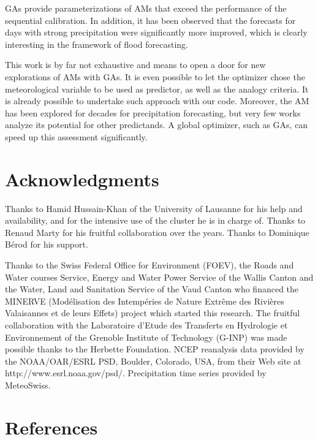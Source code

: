 \documentclass[5p]{elsarticle}
\begin{document}
GAs provide parameterizations of AMs that exceed the performance of the sequential calibration. In addition, it has been observed that the forecasts for days with strong precipitation were significantly more improved, which is clearly interesting in the framework of flood forecasting.

This work is by far not exhaustive and means to open a door for new explorations of AMs with GAs. It is even possible to let the optimizer chose the meteorological variable to be used as predictor, as well as the analogy criteria. It is already possible to undertake such approach with our code. Moreover, the AM has been explored for decades for precipitation forecasting, but very few works analyze its potential for other predictands. A global optimizer, such as GAs, can speed up this assessment significantly.


\section*{Acknowledgments}
Thanks to Hamid Hussain-Khan of the University of Lausanne for his help and availability, and for the intensive use of the cluster he is in charge of. Thanks to Renaud Marty for his fruitful collaboration over the years. Thanks to Dominique B\'{e}rod for his support.

Thanks to the Swiss Federal Office for Environment (FOEV), the Roads and Water courses Service, Energy and Water Power Service of the Wallis Canton and the Water, Land and Sanitation Service of the Vaud Canton who financed the MINERVE (Mod\'{e}lisation des Intemp\'{e}ries de Nature Extr\^{e}me des Rivi\`{e}res Valaisannes et de leurs Effets) project which started this research. The fruitful collaboration with the Laboratoire d'Etude des Transferts en Hydrologie et Environnement of the Grenoble Institute of Technology (G-INP) was made possible thanks to the Herbette Foundation. NCEP reanalysis data provided by the NOAA/OAR/ESRL PSD, Boulder, Colorado, USA, from their Web site at http://www.esrl.noaa.gov/psd/. Precipitation time series provided by MeteoSwiss. 


\section*{References}




\end{document}
